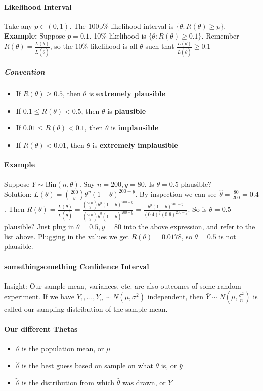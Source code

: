 \documentclass[10pt,letter]{article}
\theoremstyle{plain}
\theoremstyle{definition}
\begin{document}
\paragraph{Likelihood Interval}
Take any $p\in(0,1)$. The 100p\% likelihood interval is $\{\theta:R(\theta)\geq p\}$. \\ 
\textbf{Example:} Suppose $p=0.1$. 10\% likelihood is $\{\theta:R(\theta)\geq0.1\}$. Remember $R(\theta)=\frac{L(\theta)}{L(\hat{\theta})}$, so the 10\% likelihood is all $\theta$ such that $\frac{L(\theta)}{L(\hat{\theta})}\geq 0.1$ 
\subparagraph{Convention} 
\begin{itemize}
    \item If $R(\theta)\geq0.5$, then $\theta$ is \textbf{extremely plausible} 
    \item If $0.1\leq R(\theta)<0.5$, then $\theta$ is \textbf{plausible}
    \item If $0.01\leq R(\theta)<0.1$, then $\theta$ is \textbf{implausible}
    \item If $R(\theta)<0.01$, then $\theta$ is \textbf{extremely implausible}
\end{itemize}
\paragraph{Example}
Suppose $Y\sim\text{Bin}(n,\theta)$. Say $n=200,y=80$. Is $\theta=0.5$ plausible? \\ 
Solution: $L(\theta)=\binom{200}{y}\theta^y(1-\theta)^{200-y}$. By inspection we can see $\hat{\theta}=\frac{80}{200}=0.4$. Then $R(\theta)=\frac{L(\theta)}{L(\hat\theta)}=\frac{\binom{200}{y}\theta^y(1-\theta)^{200-y}}{\binom{200}{y}\hat\theta^y(1-\hat\theta)^{200-y}}=\frac{\theta^y(1-\theta)^{200-y}}{(0.4)^y(0.6)^{200-y}}$. So is $\theta=0.5$ plausible? Just plug in $\theta=0.5,y=80$ into the above expression, and refer to the list above. Plugging in the values we get $R(\theta)=0.0178$, so $\theta=0.5$ is not plausible. 

\paragraph{somethingsomething Confidence Interval}
Insight: Our sample mean, variances, etc. are also outcomes of some random experiment. If we have $Y_1,\ldots,Y_n\sim N(\mu,\sigma^2)$ independent, then $\bar{Y}\sim N(\mu,\frac{\sigma^2}{n})$ is called our sampling distribution of the sample mean.  
\paragraph{Our different Thetas}
\begin{itemize}
    \item $\theta$ is the population mean, or $\mu$ 
    \item $\hat{\theta}$ is the best guess based on sample on what $\theta$ is, or $\bar{y}$ 
    \item $\tilde{\theta}$ is the distribution from which $\hat{\theta}$ was drawn, or $\bar{Y}$ \\
\end{itemize}
\end{document}
